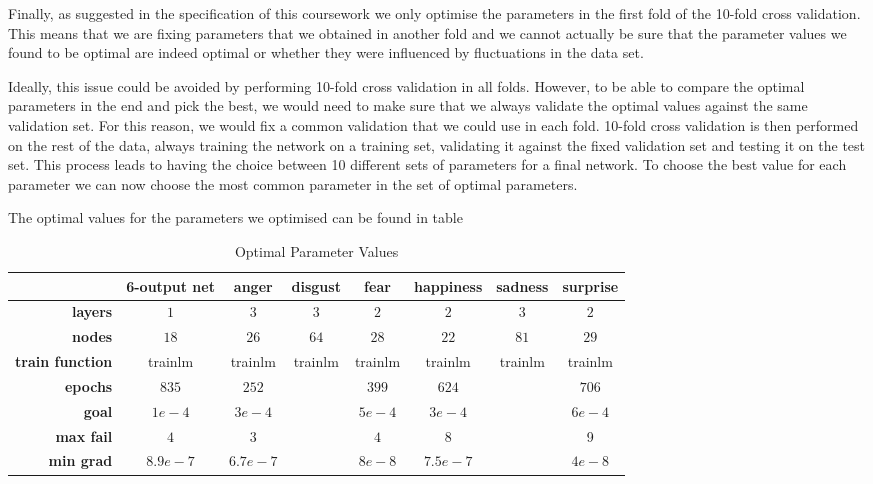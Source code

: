 \documentclass[10pt,a4paper]{article}
\begin{document}
Finally, as suggested in the specification of this coursework we only optimise the parameters in the first fold of the 10-fold cross validation. This means that we are fixing parameters that we obtained in another fold and we cannot actually be sure that the parameter values we found to be optimal are indeed optimal or whether they were influenced by fluctuations in the data set.

Ideally, this issue could be avoided by performing 10-fold cross validation in all folds. However, to be able to compare the optimal parameters in the end and pick the best, we would need to make sure that we always validate the optimal values against the same validation set. For this reason, we would fix a common validation that we could use in each fold. 10-fold cross validation is then performed on the rest of the data, always training the network on a training set, validating it against the fixed validation set and testing it on the test set. This process leads to having the choice between 10 different sets of parameters for a final network. To choose the best value for each parameter we can now choose the most common parameter in the set of optimal parameters.

The optimal values for the parameters we optimised can be found in table \

\begin{table}
\begin{tabular}{|r|c||c|c|c|c|c|c|}
\hline 
 & \textbf{6-output net} & \textbf{anger} & \textbf{disgust} & \textbf{fear} & \textbf{happiness} & \textbf{sadness} & \textbf{surprise} \\ 
\hline 
\textbf{layers} & $1$ & $3$ & $3$ & $2$ & $2$ & $3$ & $2$ \\ 
\hline 
\textbf{nodes} & $18$ & $26$ & $64$ & $28$ & $22$ & $81$ & $29$ \\ 
\hline 
\textbf{train function} & trainlm & trainlm & trainlm & trainlm & trainlm & trainlm & trainlm \\ 
\hline 
\textbf{epochs} & $835$ & $252$ &  & $399$ & $624$ &  & $706$ \\ 
\hline 
\textbf{goal} & $1e-4$ & $3e-4$ &  & $5e-4$ & $3e-4$ &  & $6e-4$ \\ 
\hline 
\textbf{max fail} & $4$ & $3$ &  & $4$ & $8$ &  & 9 \\ 
\hline 
\textbf{min grad} & $8.9e-7$ & $6.7e-7$ &  & $8e-8$ & $7.5e-7$ & & $4e-8$ \\ 
\hline 
\end{tabular} 
\caption{Optimal Parameter Values}
\label{tab:optimalValues}
\end{table}
\end{document}
